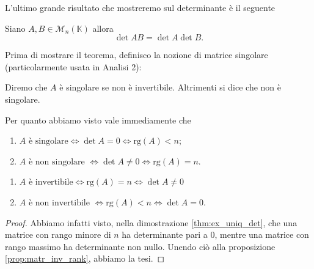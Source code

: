 L'ultimo grande risultato che mostreremo sul determinante è il seguente
\begin{theorem}[di Binet] \label{thm:binet}
    Siano $A, B \in \mathcal{M}_n(\mathbb{K})$ allora
    $$
    \det{AB} = \det{A} \det{B}.
    $$
\end{theorem}
Prima di mostrare il teorema, definisco la nozione di matrice singolare (particolarmente usata in Analisi 2):
\begin{definition}
    Diremo che $A$ è singolare se non è invertibile. Altrimenti si dice che non è singolare.
\end{definition}
Per quanto abbiamo visto vale immediamente che
\begin{prop} \hspace{1cm}
    \begin{enumerate}[label=\protect\circled{\arabic*}]
        \item $A \text{ è singolare} \iff \det{A} = 0 \iff \text{rg}(A) < n$;
        \item $A \text{ è non singolare } \iff \det{A} \neq 0 \iff \text{rg}(A) = n$.
    \end{enumerate}
\end{prop}
\begin{cor} \hspace{1cm}
    \begin{enumerate}[label=\protect\circled{\arabic*}]
        \item $A \text{ è invertibile} \iff \text{rg}(A) = n \iff \det{A} \neq 0$
        \item $A \text{ è non invertibile } \iff \text{rg}(A) < n \iff \det{A} = 0.$
    \end{enumerate}
\end{cor}
\begin{proof}
    Abbiamo infatti visto, nella dimostrazione \ref{thm:ex_uniq_det}, che una matrice con rango minore di $n$ ha determinante pari a $0$, mentre una matrice con rango massimo ha determinante non nullo. Unendo ciò alla proposizione \ref{prop:matr_inv_rank}, abbiamo la tesi. 
\end{proof}
